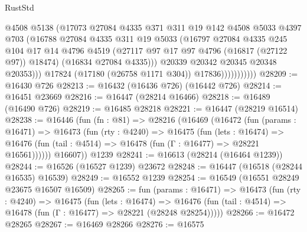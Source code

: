 \begin{lexlean}{RustStd}
\begin{coremodule}
                              @4508
                              @5138
                              (@17073
                                @27084
                                @4335
                                @371
                                @311
                                @19
                                @142
                                @4508
                                @5033
                                @4397
                                @703
                                (@16788
                                  @27084
                                  @4335
                                  @311
                                  @19
                                  @5033
                                  (@16797
                                    @27084
                                    @4335
                                    @245
                                    @104
                                    @17
                                    @14
                                    @4796
                                    @4519
                                    (@27117 @97 @17 @97 @4796 (@16817 (@27122 @97)) @18474)
                                    (@16834 @27084 @4335)))
                                @20339
                                @20342
                                @20345
                                @20348
                                @20353)))
                          @17824
                          (@17180 (@26758 @1171 @304))
                          @17836)))))))))))
@28209 := @16430 @726
@28213 := @16432 (@16436 @726) (@16442 @726)
@28214 := @16451 @23669
@28216 := @16447 (@28214 @16466)
@28218 := @16489 (@16490 @726)
@28219 := @16485 @28218
@28221 := @16447 (@28219 @16514)
@28238 := @16446
    (fun (fn : @81) =>
    @28216
      (@16469
        (@16472
          (fun (params : @16471) =>
          @16473
            (fun (rty : @4240) =>
            @16475
              (fun (lets : @16474) =>
              @16476 (fun (tail : @4514) => @16478 (fun (Γ : @16477) => @28221 @16561))))))
        @16607))
    @1239
@28241 := @16613 (@28214 (@16464 @1239))
@28244 := @16526 (@16527 @1239) @23672
@28248 := @16447 (@16518 (@28244 @16535) @16539)
@28249 := @16552 @1239
@28254 := @16549 (@16551 @28249 @23675 @16507 @16509)
@28265 := fun (params : @16471) =>
  @16473
    (fun (rty : @4240) =>
    @16475
      (fun (lets : @16474) =>
      @16476 (fun (tail : @4514) => @16478 (fun (Γ : @16477) => @28221 (@28248 @28254)))))
@28266 := @16472 @28265
@28267 := @16469 @28266
@28276 := @16575

\end{coremodule}
\end{lexlean}
